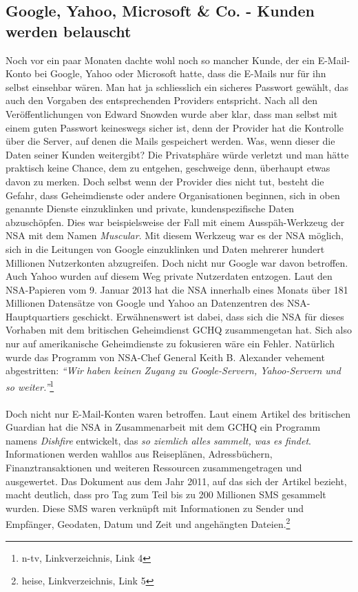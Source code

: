 \subsection{Google, Yahoo, Microsoft \& Co. - Kunden werden belauscht}
Noch vor ein paar Monaten dachte wohl noch so mancher Kunde, der ein E-Mail-Konto bei Google, Yahoo oder Microsoft hatte, dass die E-Mails nur für ihn selbst einsehbar wären. Man hat ja schliesslich ein sicheres Passwort gewählt, das auch den Vorgaben des entsprechenden Providers entspricht. Nach all den Veröffentlichungen von Edward Snowden wurde aber klar, dass man selbst mit einem guten Passwort keineswegs sicher ist, denn der Provider hat die Kontrolle über die Server, auf denen die Mails gespeichert werden. Was, wenn dieser die Daten seiner Kunden weitergibt? Die Privatsphäre würde verletzt und man hätte praktisch keine Chance, dem zu entgehen, geschweige denn, überhaupt etwas davon zu merken. Doch selbst wenn der Provider dies nicht tut, besteht die Gefahr, dass Geheimdienste oder andere Organisationen beginnen, sich in oben genannte Dienste einzuklinken und private, kundenspezifische Daten abzuschöpfen. Dies war beispielsweise der Fall mit einem Ausspäh-Werkzeug der NSA mit dem Namen \textit{Muscular}. Mit diesem Werkzeug war es der NSA möglich, sich in die Leitungen von Google einzuklinken und Daten mehrerer hundert Millionen Nutzerkonten abzugreifen. Doch nicht nur Google war davon betroffen. Auch Yahoo wurden auf diesem Weg private Nutzerdaten entzogen. Laut den NSA-Papieren vom 9. Januar 2013 hat die NSA innerhalb eines Monats über 181 Millionen Datensätze von Google und Yahoo an Datenzentren des NSA-Hauptquartiers geschickt. Erwähnenswert ist dabei, dass sich die NSA für dieses Vorhaben mit dem britischen Geheimdienst GCHQ zusammengetan hat. Sich also nur auf amerikanische Geheimdienste zu fokusieren wäre ein Fehler. Natürlich wurde das Programm von NSA-Chef General Keith B. Alexander vehement abgestritten: \textit{``Wir haben keinen Zugang zu Google-Servern, Yahoo-Servern und so weiter.''}\footnote{n-tv, Linkverzeichnis, Link 4}
\\
\\
Doch nicht nur E-Mail-Konten waren betroffen. Laut einem Artikel des britischen Guardian hat die NSA in Zusammenarbeit mit dem GCHQ ein Programm namens \textit{Dishfire} entwickelt, das \textit{so ziemlich alles sammelt, was es findet}. Informationen werden wahllos aus Reiseplänen, Adressbüchern, Finanztransaktionen und weiteren Ressourcen zusammengetragen und ausgewertet. Das Dokument aus dem Jahr 2011, auf das sich der Artikel bezieht, macht deutlich, dass pro Tag zum Teil bis zu 200 Millionen SMS gesammelt wurden. Diese SMS waren verknüpft mit Informationen zu Sender und Empfänger, Geodaten, Datum und Zeit und angehängten Dateien.\footnote{heise, Linkverzeichnis, Link 5}

